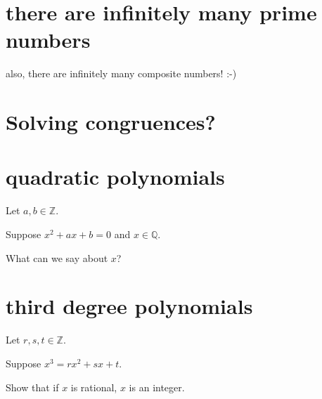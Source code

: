 \documentclass[12pt]{handout}
\begin{document}
\section*{there are infinitely many prime numbers}

also, there are infinitely many composite numbers!  :-)

\section*{Solving congruences?}

\section*{quadratic polynomials}

Let $a,b \in \mathbb{Z}$.

Suppose $x^2 + ax + b = 0$ and $x \in \mathbb{Q}$.

What can we say about $x$?

\section*{third degree polynomials}

Let $r,s,t \in \mathbb{Z}$.

Suppose $x^3 = rx^2 + sx + t$.

Show that if $x$ is rational, $x$ is an integer.
\end{document}
